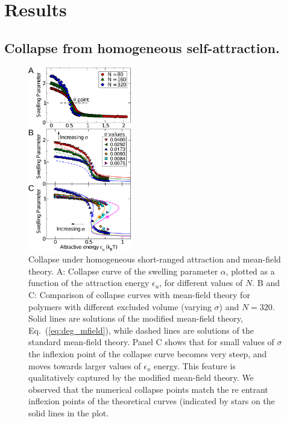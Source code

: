 \documentclass[
preprint,
a4paper,
12pt,
superscriptaddress,
pre]{revtex4}
\begin{document}
\section{Results}


\subsection*{Collapse from homogeneous self-attraction. }


\begin{figure}
  \centering
  \includegraphics[width=0.4\textwidth]{fig_2}
  \caption{Collapse under homogeneous short-ranged attraction and
    mean-field theory. A: Collapse curve of the swelling parameter
    $\alpha$, plotted as a function of the attraction energy
    $\epsilon_u$, for different values of $N$. B and C: Comparison of
    collapse curves with mean-field theory for polymers with different
    excluded volume (varying $\sigma$) and $N=320$.  Solid lines are
    solutions of the modified mean-field theory,
    Eq.~(\ref{eq:deg_mfield}), while dashed lines are solutions of the
    standard mean-field theory. Panel C shows that for small values of
    $\sigma$ the inflexion point of the collapse curve becomes very
    steep, and moves towards larger values of $\epsilon_u$
    energy. This feature is qualitatively captured by the modified
    mean-field theory. We observed that the numerical collapse points
    match the re entrant inflexion points of the theoretical curves
    (indicated by stars on the solid lines in the plot.  }
  \label{fig:2}
\end{figure}
\end{document}
